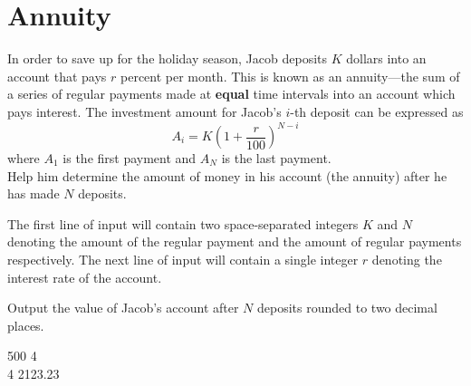 \section{Annuity}
In order to save up for the holiday season, Jacob deposits $K$ dollars into an account that pays $r$ percent per month. This is known as an annuity—the sum of a series of regular payments made at \textbf{equal} time intervals into an account which pays interest. The investment amount for Jacob's $i$-th deposit can be expressed as $$A_i = K(1 + \frac{r}{100})^{N - i}$$ where $A_1$ is the first payment and $A_N$ is the last payment. \\

Help him determine the amount of money in his account (the annuity) after he has made $N$ deposits.

The first line of input will contain two space-separated integers $K$ and $N$ denoting the amount of the regular payment and the amount of regular payments respectively. The next line of input will contain a single integer $r$ denoting the interest rate of the account.

\outputformat
Output the value of Jacob's account after $N$ deposits rounded to two decimal places.

\addsample
{
    500 4 \\
    4
}
{
    2123.23
}
